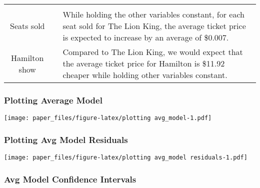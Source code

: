 \documentclass[
]{article}
\begin{document}
\begin{longtable}[]{@{}ccl@{}}
\begin{minipage}[t]{0.23\columnwidth}
\end{minipage}\tabularnewline
\begin{minipage}[t]{0.34\columnwidth}\centering
Seats sold\strut
\end{minipage} & \begin{minipage}[t]{0.34\columnwidth}\centering
0.007\strut
\end{minipage} & \begin{minipage}[t]{0.23\columnwidth}\raggedright
While holding the other variables constant, for each seat sold for The Lion King, the average ticket price is expected to increase by an average of \$0.007.\strut
\end{minipage}\tabularnewline
\begin{minipage}[t]{0.34\columnwidth}\centering
Hamilton show\strut
\end{minipage} & \begin{minipage}[t]{0.34\columnwidth}\centering
-11.92\strut
\end{minipage} & \begin{minipage}[t]{0.23\columnwidth}\raggedright
Compared to The Lion King, we would expect that the average ticket price for Hamilton is \$11.92 cheaper while holding other variables constant.\strut
\end{minipage}\tabularnewline
\bottomrule
\end{longtable}

\hypertarget{plotting-average-model}{%
\subsubsection{Plotting Average Model}\label{plotting-average-model}}

\texttt{[image: paper\_files/figure-latex/plotting avg\_model-1.pdf]}

\hypertarget{plotting-avg-model-residuals}{%
\subsubsection{Plotting Avg Model Residuals}\label{plotting-avg-model-residuals}}

\texttt{[image: paper\_files/figure-latex/plotting avg\_model residuals-1.pdf]}

\hypertarget{avg-model-confidence-intervals}{%
\subsubsection{Avg Model Confidence Intervals}\label{avg-model-confidence-intervals}}
\end{document}
